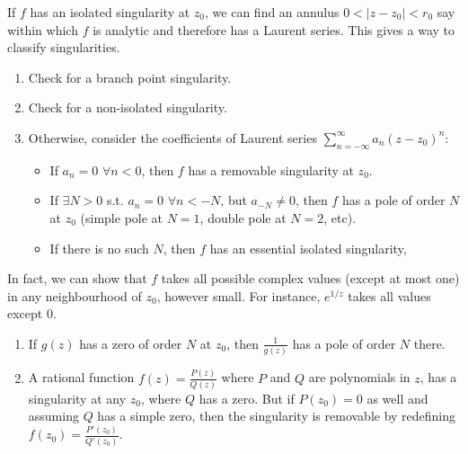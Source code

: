\documentclass[a4paper]{article}
\begin{document}
\begin{remarks}
If $f$ has an isolated singularity at $z_0$, we can find an annulus $0<|z-z_0|<r_0$ say within which $f$ is analytic and therefore has a Laurent series. This gives a way to classify singularities.
\begin{enumerate}
    \item Check for a branch point singularity.
    \item Check for a non-isolated singularity.
    \item Otherwise, consider the coefficients of Laurent series $\sum_{n=-\infty}^\infty a_n(z-z_0)^n$:
    \begin{itemize}
        \item If $a_n=0$ $\forall n<0$, then $f$ has a removable singularity at $z_0$.
        \item If $\exists N>0$ s.t. $a_n=0$ $\forall n<-N$, but $a_{-N}\neq 0$, then $f$ has a pole of order $N$ at $z_0$ (simple pole at $N=1$, double pole at $N=2$, etc).
        \item If there is no such $N$, then $f$ has an essential isolated singularity,
    \end{itemize}
\end{enumerate}
In fact, we can show that $f$ takes all possible complex values (except at most one) in any neighbourhood of $z_0$, however small. For instance, $e^{1/z}$ takes all values except 0.
\end{remarks}
\begin{prop}\leavevmode
\begin{enumerate}
    \item If $g(z)$ has a zero of order $N$ at $z_0$, then $\frac{1}{g(z)}$ has a pole of order $N$ there.
    \item A rational function $f(z)=\frac{P(z)}{Q(z)}$ where $P$ and $Q$ are polynomials in $z$, has a singularity at any $z_0$, where $Q$ has a zero. But if $P(z_0)=0$ as well and assuming $Q$ has a simple zero, then the singularity is removable by redefining $f(z_0)=\frac{P'(z_0)}{Q'(z_0)}$.
\end{enumerate}
\end{prop}
\newpage
\end{document}
